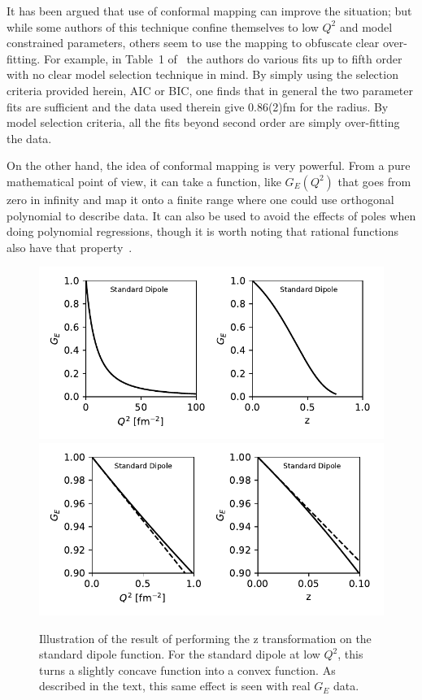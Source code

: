 \documentclass[10pt,superscriptaddress,aps,prc,twocolumn]{revtex4-1}
\begin{document}
\begin{appendix}
It has been argued that use of conformal mapping can improve the situation; but while some authors of this
technique confine themselves to low $Q^2$ and model constrained parameters, others seem to use the
mapping to obfuscate clear over-fitting.    
For example, in Table~1 of~\cite{Hill:2010yb}
the authors do various fits up to fifth order with no clear model selection technique in mind.
By simply using the selection criteria provided herein, AIC or BIC, one finds that
in general the two parameter fits are sufficient and the data used therein 
give 0.86(2)fm for the radius.   By model selection criteria, all the fits beyond second 
order are simply over-fitting the data.   

On the other hand, the idea of conformal mapping is very powerful.   From a pure mathematical point
of view, it can take a function, like $G_E(Q^2)$ that goes from zero in infinity and map it onto a
finite range where one could use orthogonal polynomial to describe data.   It can also be used to
avoid the effects of poles when doing polynomial regressions, though it is worth noting
that rational functions also have that property~\cite{NR}.

\begin{figure}
\includegraphics[width=\columnwidth]{Figure/z-q2-sd.pdf}
\includegraphics[width=\columnwidth]{Figure/z-q2-sd-zoomed.pdf}
\caption{Illustration of the result of performing the z transformation on the standard dipole function. 
For the standard dipole at low $Q^2$, this turns a slightly concave function into a convex function.
As described in the text, this same effect is seen with real $G_E$ data.}
\end{figure}


\end{appendix}
\end{document}

